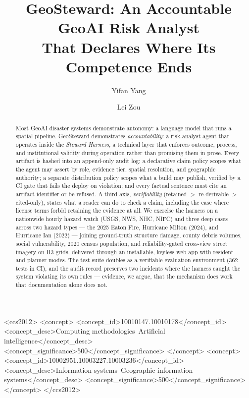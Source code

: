 \documentclass[sigconf,screen]{acmart}
\begin{document}
\title{GeoSteward: An Accountable GeoAI Risk Analyst\\ That Declares Where Its Competence Ends}

\author{Yifan Yang}

\author{Lei Zou}

\begin{abstract}
Most GeoAI disaster systems demonstrate autonomy: a language model that
runs a spatial pipeline. GeoSteward demonstrates \emph{accountability}: a
risk-analyst agent that operates inside the \emph{Steward Harness}, a
technical layer that enforces outcome, process, and institutional
validity during operation rather than promising them in prose. Every
artifact is hashed into an append-only audit log; a declarative claim
policy scopes what the agent may assert by role, evidence tier, spatial
resolution, and geographic authority; a separate distribution policy
scopes what a build may publish, verified by a CI gate that fails the
deploy on violation; and every factual sentence must cite an artifact
identifier or be refused. A third axis, \emph{verifiability}
(retained $>$ re-derivable $>$ cited-only), states what a reader can do
to check a claim, including the case where license terms forbid
retaining the evidence at all. We exercise the harness on a nationwide
hourly hazard watch (USGS, NWS, NHC, NIFC) and three deep cases across
two hazard types --- the 2025 Eaton Fire, Hurricane Milton (2024), and
Hurricane Ian (2022) --- joining ground-truth structure damage, county
debris volumes, social vulnerability, 2020 census population, and
reliability-gated cross-view street imagery on H3 grids, delivered through an installable, keyless
web app with resident and planner modes. The test suite doubles as a
verifiable evaluation environment (362 tests in CI), and the audit
record preserves two incidents where the harness caught the system
violating its own rules --- evidence, we argue, that the mechanism does
work that documentation alone does not.
\end{abstract}

\begin{CCSXML}
<ccs2012>
<concept>
<concept_id>10010147.10010178</concept_id>
<concept_desc>Computing methodologies~Artificial intelligence</concept_desc>
<concept_significance>500</concept_significance>
</concept>
<concept>
<concept_id>10002951.10003227.10003236</concept_id>
<concept_desc>Information systems~Geographic information systems</concept_desc>
<concept_significance>500</concept_significance>
</concept>
</ccs2012>
\end{CCSXML}
\end{document}
